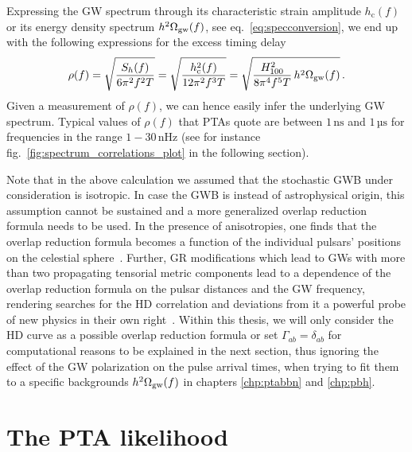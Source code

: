 Expressing the \ac{GW} spectrum  through its characteristic strain amplitude $h_\text{c}(f)$ or its energy density spectrum $h^2 \Omega_{\text{gw}}(f)$, see eq.~\eqref{eq:specconversion}, we end up with the following expressions for the excess timing delay
\begin{align}
	\rho(f) = \sqrt{\frac{S_h(f)}{6 \pi^2 f^2 T}} = \sqrt{\frac{h_\text{c}^2(f)}{12 \pi^2 f^3 T}} = \sqrt{\frac{H_{100}^2}{8 \pi^4 f^5 T} \,  h^2 \Omega_{\text{gw}}(f)} \, .  \label{eq:rhof}
\end{align}
Given a  measurement of $\rho(f)$, we can hence easily infer the underlying \ac{GW} spectrum. Typical values of $\rho(f)$ that \acp{PTA} quote are between $1 \, \text{ns}$ and $1 \, \text{µs}$ for frequencies in the range $1 - 30 \, \text{nHz}$ (see for instance fig.~\ref{fig:spectrum_correlations_plot} in the following section).

Note that in the above calculation we assumed that the stochastic \ac{GWB} under consideration is isotropic. In case the \ac{GWB} is instead of astrophysical origin, this assumption cannot be sustained and a more generalized overlap reduction formula needs to be used. In the presence of anisotropies,  one finds that the overlap reduction formula becomes a function of the individual pulsars' positions on the celestial sphere~\cite{Bernardo:2022xzl}. Further, \ac{GR} modifications which lead to \acp{GW} with more than two propagating tensorial metric components lead to a dependence of the overlap reduction formula on the pulsar distances and the \ac{GW} frequency, rendering searches for the \ac{HD} correlation and deviations from it a powerful probe of new physics in their own right~\cite{Bernardo:2023mxc}. Within this thesis, we will only consider the \ac{HD} curve as a possible overlap reduction formula or set $\Gamma_{ab} = \delta_{ab}$ for computational reasons to be explained in the next section, thus ignoring the effect of the \ac{GW} polarization on the pulse arrival times, when trying to fit them to a specific backgrounds $h^2 \Omega_{\text{gw}}(f)$ in chapters \ref{chp:ptabbn} and \ref{chp:pbh}.

\section{The PTA likelihood} \label{sec:PTAlikelihood}


